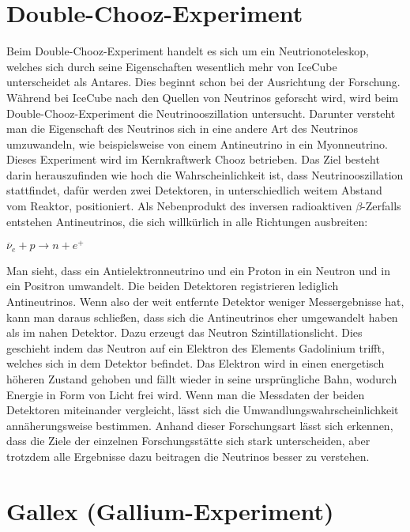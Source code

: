     \section{Double-Chooz-Experiment}

    Beim Double-Chooz-Experiment handelt es sich um ein Neutrionoteleskop, welches sich durch seine 
    \grqq Eigenschaften\grqq{} wesentlich mehr von IceCube unterscheidet als Antares. Dies beginnt schon bei der 
    Ausrichtung der Forschung. Während bei IceCube nach den Quellen von Neutrinos geforscht wird, wird 
    beim Double-Chooz-Experiment die Neutrinooszillation untersucht. Darunter versteht man die Eigenschaft 
    des Neutrinos sich in eine andere Art des Neutrinos umzuwandeln, wie beispielsweise von einem Antineutrino 
    in ein Myonneutrino. Dieses Experiment wird im Kernkraftwerk Chooz betrieben. Das Ziel besteht darin 
    herauszufinden wie hoch die Wahrscheinlichkeit ist, dass Neutrinooszillation stattfindet, dafür werden 
    zwei Detektoren, in unterschiedlich weitem Abstand vom Reaktor, positioniert. Als Nebenprodukt des 
    inversen radioaktiven $\beta$-Zerfalls entstehen Antineutrinos, die sich willkürlich in alle Richtungen ausbreiten:
    \begin{center}
        $\overline{\nu}_e + p \rightarrow n + e^+ $
    \end{center}
    Man sieht, dass ein Antielektronneutrino und ein Proton in ein Neutron und in ein Positron umwandelt. 
    Die beiden Detektoren registrieren lediglich Antineutrinos. Wenn also der weit entfernte Detektor 
    weniger Messergebnisse hat, kann man daraus schließen, dass sich die Antineutrinos eher umgewandelt 
    haben als im nahen Detektor. Dazu erzeugt das Neutron Szintillationslicht. Dies geschieht indem das 
    Neutron auf ein Elektron des Elements Gadolinium trifft, welches sich in dem Detektor befindet. 
    Das Elektron wird in einen energetisch höheren Zustand gehoben und fällt wieder in seine ursprüngliche 
    Bahn, wodurch Energie in Form von Licht frei wird. Wenn man die Messdaten der beiden Detektoren miteinander 
    vergleicht, lässt sich die Umwandlungswahrscheinlichkeit annäherungsweise bestimmen. Anhand dieser 
    Forschungsart lässt sich erkennen, dass die Ziele der einzelnen Forschungsstätte sich stark unterscheiden, 
    aber trotzdem alle Ergebnisse dazu beitragen die Neutrinos besser zu verstehen. \cite{DCCos12}

    \section{Gallex (Gallium-Experiment)}

